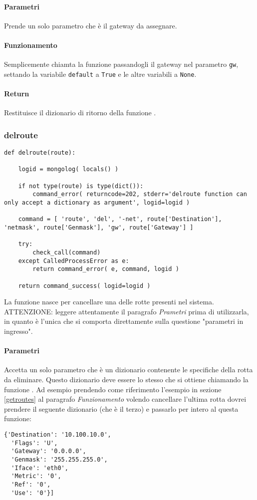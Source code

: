 \documentclass[11pt]{article}
\begin{document}
\paragraph{Parametri}
Prende un solo parametro che è il gateway da assegnare.
\paragraph{Funzionamento}
Semplicemente chiamta la funzione  passandogli il gateway nel parametro \texttt{gw}, settando
la variabile \texttt{default} a \texttt{True} e le altre variabili a \texttt{None}.
\paragraph{Return}
Restituisce il dizionario di ritorno della funzione .

\subsubsection{delroute}\label{delroute}
\begin{lstlisting}
def delroute(route):

    logid = mongolog( locals() )

    if not type(route) is type(dict()):
        command_error( returncode=202, stderr='delroute function can only accept a dictionary as argument', logid=logid )

    command = [ 'route', 'del', '-net', route['Destination'], 'netmask', route['Genmask'], 'gw', route['Gateway'] ]

    try:
        check_call(command)
    except CalledProcessError as e:
        return command_error( e, command, logid )

    return command_success( logid=logid )
\end{lstlisting}
La funzione nasce per cancellare una delle rotte presenti nel sistema.\\
ATTENZIONE: leggere attentamente il paragrafo \textit{Prametri} prima di utilizzarla, in quanto è l'unica
che si comporta direttamente sulla questione "parametri in ingresso".
\paragraph{Parametri}
Accetta un solo parametro che è un dizionario contenente le specifiche della rotta da eliminare. Questo dizionario deve
essere lo stesso che si ottiene chiamando la funzione . Ad esempio prendendo come riferimento l'esempio
in sezione \ref{getroutes} al paragrafo \textit{Funzionamento} volendo cancellare l'ultima rotta dovrei prendere il seguente
dizionario (che è il terzo) e passarlo per intero al questa funzione:
\begin{lstlisting}
{'Destination': '10.100.10.0',
  'Flags': 'U',
  'Gateway': '0.0.0.0',
  'Genmask': '255.255.255.0',
  'Iface': 'eth0',
  'Metric': '0',
  'Ref': '0',
  'Use': '0'}]
\end{lstlisting}
\end{document}
